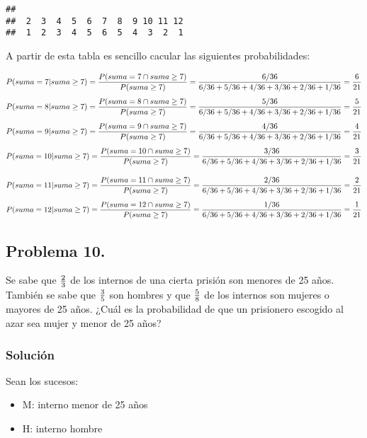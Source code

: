 \documentclass[
]{article}
\providecommand{\tightlist}{%
  \setlength{\itemsep}{0pt}\setlength{\parskip}{0pt}}
\begin{document}
\begin{verbatim}
## 
##  2  3  4  5  6  7  8  9 10 11 12 
##  1  2  3  4  5  6  5  4  3  2  1
\end{verbatim}

A partir de esta tabla es sencillo cacular las siguientes
probabilidades:

\[
P(suma = 7|suma \geq 7) = \frac{P(suma =7 \cap suma \geq 7)}{P(suma \geq 7)} = \\
\frac{6/36}{6/36 + 5/36 + 4/36 + 3/36 + 2/36 + 1/36} = \frac{6}{21}
\] \[
P(suma = 8|suma \geq 7) = \frac{P(suma = 8 \cap suma \geq 7)}{P(suma \geq 7)} = \\
\frac{5/36}{6/36 + 5/36 + 4/36 + 3/36 + 2/36 + 1/36} = \frac{5}{21}
\] \[
P(suma = 9|suma \geq 7) = \frac{P(suma =9 \cap suma \geq 7)}{P(suma \geq 7)} = \\
\frac{4/36}{6/36 + 5/36 + 4/36 + 3/36 + 2/36 + 1/36} = \frac{4}{21}
\] \[
P(suma = 10|suma \geq 7) = \frac{P(suma = 10 \cap suma \geq 7)}{P(suma \geq 7)} = \\
\frac{3/36}{6/36 + 5/36 + 4/36 + 3/36 + 2/36 + 1/36} = \frac{3}{21}
\]

\[
P(suma = 11|suma \geq 7) = \frac{P(suma = 11 \cap suma \geq 7)}{P(suma \geq 7)} = \\
\frac{2/36}{6/36 + 5/36 + 4/36 + 3/36 + 2/36 + 1/36} = \frac{2}{21}
\] \[
P(suma = 12|suma \geq 7) = \frac{P(suma =12 \cap suma \geq 7)}{P(suma \geq 7)} = \\
\frac{1/36}{6/36 + 5/36 + 4/36 + 3/36 + 2/36 + 1/36} = \frac{1}{21}
\]

\hypertarget{problema-10.}{%
\subsection{Problema 10.}\label{problema-10.}}

Se sabe que \({2 \over 3}\) de los internos de una cierta prisión son
menores de 25 años. También se sabe que \({3\over 5}\) son hombres y que
\({5\over 8}\) de los internos son mujeres o mayores de 25 años. ¿Cuál
es la probabilidad de que un prisionero escogido al azar sea mujer y
menor de 25 años?

\hypertarget{soluciuxf3n-8}{%
\subsubsection{Solución}\label{soluciuxf3n-8}}

Sean los sucesos:

\begin{itemize}
\tightlist
\item
  M: interno menor de 25 años
\item
  H: interno hombre
\end{itemize}
\end{document}
